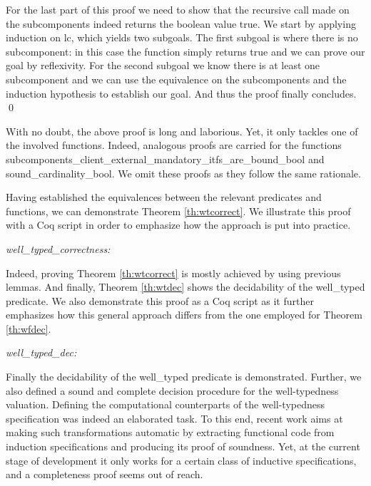 \begin{lemma}
	
		For the last part of this proof we need to show that the recursive call made on the sub\textsf{component}s
	indeed returns the boolean value true. We start by applying induction on \textsf{lc},  which yields two subgoals.
	The first subgoal is where there is no sub\textsf{component}: in this case the function simply returns true 
	and we can prove our goal by reflexivity. For the second subgoal we know there is at least one sub\textsf{component}
	and we can use the equivalence on the sub\textsf{component}s and the induction hypothesis to establish our goal.
	And thus the proof finally concludes. \qed	
	\end{lemma}	
	
	\noindent With no doubt, the above proof is long and laborious. Yet, it only tackles one of the involved
	functions. Indeed, analogous proofs are carried for the functions 
	\textsf{subcomponents\_client\_external\_mandatory\_itfs\_are\_bound\_bool} and 
	\textsf{sound\_cardinality\_bool}. We omit these proofs as they follow the same rationale. 
	
	Having established the equivalences between the relevant predicates and functions, we can 
	demonstrate Theorem \ref{th:wtcorrect}. We illustrate this proof with a Coq script 
	in order to emphasize how the approach is put into practice.

	\begin{theorem} \label{th:wtcorrect} \textit{well_typed_correctness:}
	\vspace{-0.2cm}
			
	\end{theorem}


	\noindent Indeed, proving Theorem \ref{th:wtcorrect} is mostly achieved by using previous lemmas.
	And finally, Theorem \ref{th:wtdec} shows the decidability of the \textsf{well\_typed} predicate.
	We also demonstrate this proof as a Coq script as it further emphasizes how this general approach
	differs from the one employed for Theorem \ref{th:wfdec}.

	\begin{theorem} \label{th:wtdec} \textit{well_typed_dec:}
	\vspace{-0.2cm}
			
	\end{theorem}


		Finally the decidability of the \textsf{well\_typed} predicate is demonstrated. Further, we also 
	defined a sound and complete decision procedure for the well-typedness valuation. Defining the 
	computational counterparts of the well-typedness specification was indeed	an elaborated task.	
	To this end, recent work \cite{CoqSpecCode:2012} aims at making such transformations automatic by
	extracting functional code from induction specifications and producing its proof of soundness.
	Yet, at the current stage of development it only works for a certain class of inductive 
	specifications, and a completeness proof seems out of reach.


